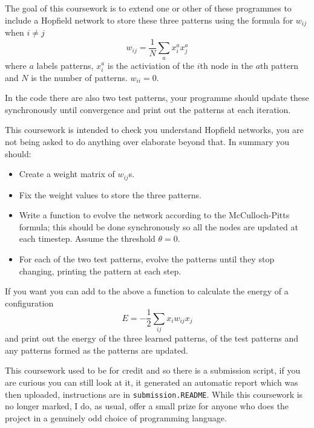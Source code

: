 \documentclass[12pt]{article}
\begin{document}
The goal of this coursework is to extend one or other of these
programmes to include a Hopfield network to store these three
patterns using the formula for $w_{ij}$ when $i\not=j$
\begin{equation}
w_{ij}=\frac{1}{N}\sum_a x_i^a x_j^a
\end{equation}
where $a$ labels patterns, $x_i^a$ is the activiation of the $i$th
node in the $a$th pattern and $N$ is the number of
patterns. $w_{ii}=0$.

In the code there are also two test patterns, your programme should
update these synchronously until convergence and print out the
patterns at each iteration. 


This coursework is intended to check you understand Hopfield networks,
you are not being asked to do anything over elaborate beyond that. In
summary you should:
\begin{itemize}
\item Create a weight matrix of $w_{ij}$s.
\item Fix the weight values to store the three patterns.
\item Write a function to evolve the network according to the
  McCulloch-Pitts formula; this should be done synchronously so all the nodes are updated at each timestep. Assume the threshold $\theta=0$.
\item For each of the two test patterns, evolve the patterns until they stop changing, printing the pattern at each step.
\end{itemize}


If you want you can add to the above a function to calculate the energy of a configuration
\begin{equation}
E=-\frac{1}{2}\sum_{ij} x_i w_{ij} x_j
\end{equation}
and print out the energy of the three learned patterns, of the test
patterns and any patterns formed as the patterns are updated.

This coursework used to be for credit and so there is a submission
script, if you are curious you can still look at it, it generated an
automatic report which was then uploaded, instructions are in
\texttt{submission.README}. While this coursework is no longer marked,
I do, as usual, offer a small prize for anyone who does the project in
a genuinely odd choice of programming language.
\end{document}
